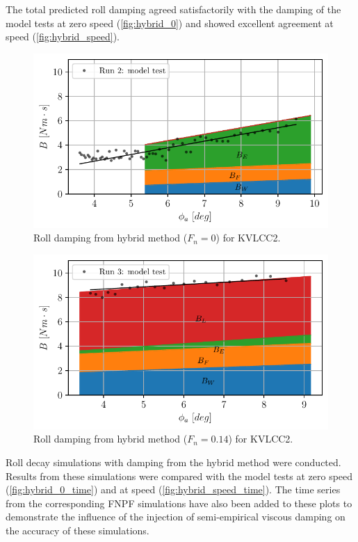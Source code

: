 The total predicted roll damping agreed satisfactorily with the damping of the model tests at zero speed (\autoref{fig:hybrid_0}) and showed excellent agreement at speed (\autoref{fig:hybrid_speed}).
\begin{figure}[h]
\begin{center}\includegraphics[width=\textwidth]{figures/hybrid_0.pdf}\end{center}
\caption{Roll damping from hybrid method ($F_n = 0$) for KVLCC2.}
\label{fig:hybrid_0}
\end{figure}
\begin{figure}[h]
\begin{center}\includegraphics[width=\textwidth]{figures/hybrid_speed.pdf}\end{center}
\caption{Roll damping from hybrid method ($F_n = 0.14$) for KVLCC2.}
\label{fig:hybrid_speed}
\end{figure}
Roll decay simulations with damping from the hybrid method were conducted. Results from these simulations were compared with the model tests at zero speed (\autoref{fig:hybrid_0_time}) and at speed (\autoref{fig:hybrid_speed_time}). The time series from the corresponding FNPF
simulations have also been added to these plots to demonstrate the influence of the injection of semi-empirical viscous damping on the accuracy of these simulations.

